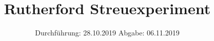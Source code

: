 

\subject{Versuch 16}
\title{Rutherford Streuexperiment}
\date{%
  Durchführung: 28.10.2019
  \hspace{3em}
  Abgabe: 06.11.2019
}



\maketitle
\thispagestyle{empty}
\tableofcontents
\newpage






\printbibliography{}


